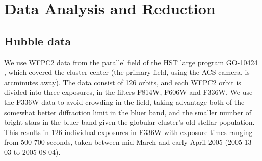 \documentclass[fleqn,usenatbib,useAMS,letters]{mnras}
\begin{document}
\section{Data Analysis and Reduction}

\subsection{Hubble data}

We use WFPC2 data from the parallel field of the HST large program %
GO-10424 \citep{2006Sci...313..936R}, which covered the cluster center (the primary field, using the ACS camera, is arcminutes away). The data consist of 126 orbits, and each WFPC2 orbit is divided into three exposures, in the filters F814W, F606W and F336W.
We use the F336W data to avoid crowding in the field, taking advantage both of the somewhat better diffraction limit in the bluer band, and the smaller number of bright stars in the bluer band given the globular cluster's old stellar population. This results in 126 individual exposures in F336W with exposure times ranging from 500-700 seconds, taken between mid-March and early April 2005 (2005-13-03 to 2005-08-04).
\end{document}
